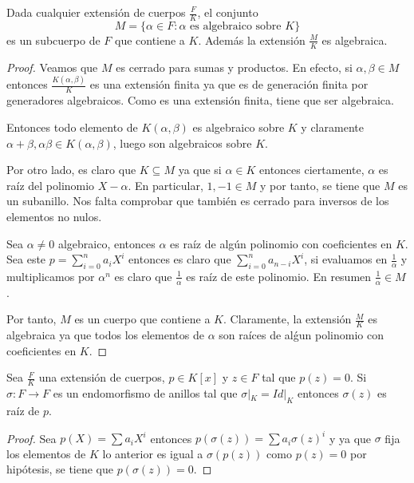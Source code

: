 \begin{lemma}\label{numeros-algebraicos}
Dada cualquier extensión de cuerpos $\frac{F}{K}$, el conjunto $$M = \{\alpha \in F:\alpha \text{ es algebraico sobre } K\}$$ es un subcuerpo de $F$ que contiene a $K$. Además la extensión $\frac{M}{K}$ es algebraica. 
\end{lemma}
\begin{proof}
Veamos que $M$ es cerrado para sumas y productos. En efecto, si $\alpha,\beta \in M$ entonces $\frac{K(\alpha,\beta)}{K}$ es una extensión finita ya que es de generación finita por generadores algebraicos. Como es una extensión finita, tiene que ser algebraica. 

Entonces todo elemento de $K(\alpha,\beta)$ es algebraico sobre $K$ y claramente $\alpha + \beta, \alpha \beta \in K(\alpha,\beta)$, luego son algebraicos sobre $K$.

Por otro lado, es claro que $K \subseteq M$ ya que si $\alpha \in K$ entonces ciertamente, $\alpha$ es raíz del polinomio $X-\alpha$. En particular, $1,-1 \in M$ y por tanto, se tiene que $M$ es un subanillo. Nos falta comprobar que también es cerrado para inversos de los elementos no nulos. 

Sea $\alpha \neq 0$ algebraico, entonces $\alpha$ es raíz de algún polinomio con coeficientes en $K$. Sea este $p = \sum_{i = 0}^n a_i X^i$ entonces es claro que $\sum_{i = 0}^{n} a_{n-i}X^i$, si evaluamos en $\frac{1}{\alpha}$ y multiplicamos por $\alpha^n$ es claro que $\frac{1}{\alpha}$ es raíz de este polinomio. En resumen $\frac{1}{\alpha} \in M$. 

Por tanto, $M$ es un cuerpo que contiene a $K$. Claramente, la extensión $\frac{M}{K}$ es algebraica ya que todos los elementos de $\alpha$ son raíces de alǵun polinomio con coeficientes en $K$. 
\end{proof}

\begin{lemma}\label{conjugado}
Sea $\frac{F}{K}$ una extensión de cuerpos, $p \in K[x]$ y $z \in F$ tal que $p(z) = 0$. Si $\sigma:F \to F$ es un endomorfismo de anillos tal que $\sigma|_{K} = Id|_{K}$ entonces $\sigma(z)$ es raíz de $p$. 
\end{lemma}
\begin{proof}
Sea $p(X) = \sum a_i X^i$ entonces $p(\sigma(z)) = \sum a_i \sigma(z)^i$ y ya que $\sigma$ fija los elementos de $K$ lo anterior es igual a $\sigma(p(z))$ como $p(z) = 0$ por hipótesis, se tiene que $p(\sigma(z)) = 0$. 
\end{proof}

